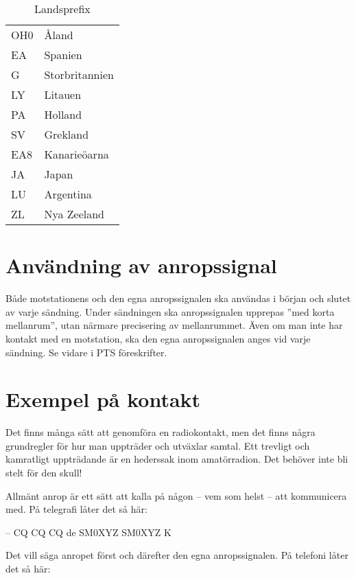 \begin{table*}[ht]
\begin{center}
\begin{minipage}{.3\linewidth}
\begin{tabular}{ll}
        \hline
        OH0           & Åland          \\
        EA            & Spanien        \\
        G             & Storbritannien \\
        LY            & Litauen        \\
        PA            & Holland        \\
        SV            & Grekland       \\
        EA8           & Kanarieöarna   \\
        JA            & Japan          \\
        LU            & Argentina      \\
        ZL            & Nya Zeeland    \\
      \end{tabular}
    \end{minipage}
    \caption{Landsprefix}
    \label{tab:landsprefix}
  \end{center}
\end{table*}

\section{Användning av anropssignal}

Både motstationens och den egna anropssignalen ska användas i början
och slutet av varje sändning.
Under sändningen ska anropssignalen upprepas ''med korta mellanrum'', utan
närmare precisering av mellanrummet.
Även om man inte har kontakt med en motstation, ska den egna anropssignalen
anges vid varje sändning.
Se vidare i PTS föreskrifter.

\section{Exempel på kontakt}

Det finns många sätt att genomföra en radiokontakt, men det finns några
grundregler för hur man uppträder och utväxlar samtal.
Ett trevligt och kamratligt uppträdande är en hederssak inom amatörradion.
Det behöver inte bli stelt för den skull!

Allmänt anrop är ett sätt att kalla på någon
-- vem som helst -- att kommunicera med.
På telegrafi låter det så här:

-- CQ CQ CQ de SM0XYZ SM0XYZ K

Det vill säga anropet först och därefter den egna anropssignalen.
På telefoni låter det så här:

